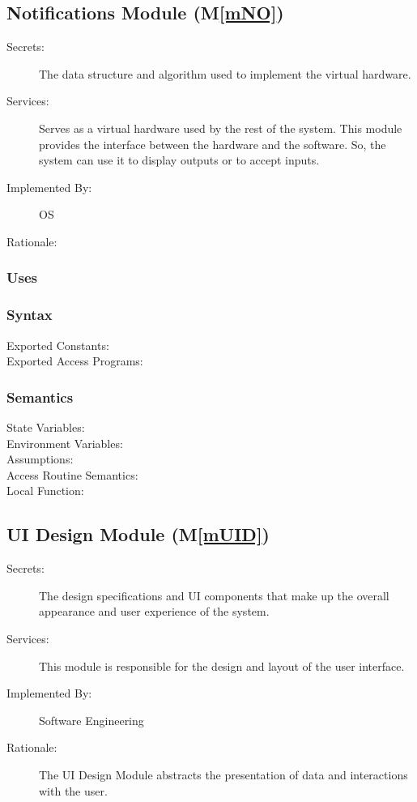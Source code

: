 \documentclass[12pt, titlepage]{article}
\newcommand{\mref}[1]{M\ref{#1}}
\begin{document}
\subsection{Notifications Module (\mref{mNO})}
\begin{description}
  \item[Secrets:]The data structure and algorithm used to implement the virtual
    hardware.
  \item[Services:]Serves as a virtual hardware used by the rest of the
    system. This module provides the interface between the hardware and the
    software. So, the system can use it to display outputs or to accept inputs.
  \item[Implemented By:] OS
  \item[Rationale:] 
\end{description}

\subsubsection{Uses}

\subsubsection{Syntax}
\begin{description}
  \item[Exported Constants:] 
  \item[Exported Access Programs:] 
\end{description}

\subsubsection{Semantics}
\begin{description}
  \item[State Variables:]
  \item[Environment Variables:]  
  \item[Assumptions:] 
  \item[Access Routine Semantics:] 
  \item[Local Function:] 
\end{description}

\subsection{UI Design Module (\mref{mUID})}
\begin{description}
  \item[Secrets:] The design specifications and UI components that make  up the
  overall appearance and user experience of the system.
  \item[Services:] This module is responsible for the design and layout of the
  user interface.
  \item[Implemented By:] Software Engineering
  \item[Rationale:] The UI Design Module abstracts the presentation of data and
  interactions with the user.
\end{description}
\end{document}
